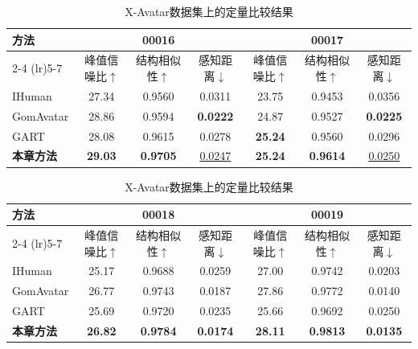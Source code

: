 \begin{table}[htbp]
    \centering\small
    \caption{X-Avatar数据集上的定量比较结果}
    \label{tab:xavatar}
    \setlength{\tabcolsep}{1pt}
    \renewcommand{\arraystretch}{1.1}

    \begin{tabular}{l ccc ccc}
        \toprule
        \multirow{2}{*}{\textbf{方法}} &
        \multicolumn{3}{c}{\textbf{00016}} &
        \multicolumn{3}{c}{\textbf{00017}} \\
        \cmidrule(lr){2-4} \cmidrule(lr){5-7}
        & 峰值信噪比$\uparrow$ & 结构相似性$\uparrow$ & 感知距离$\downarrow$
        & 峰值信噪比$\uparrow$ & 结构相似性$\uparrow$ & 感知距离$\downarrow$ \\
        \midrule
        IHuman
        & 27.34 & 0.9560 & 0.0311
        & 23.75 & 0.9453 & 0.0356 \\
        GomAvatar
        & 28.86 & 0.9594 & \textbf{0.0222}
        & 24.87 & 0.9527 & \textbf{0.0225} \\
        GART
        & 28.08 & 0.9615 & 0.0278
        & \textbf{25.24} & 0.9560 & 0.0296 \\
        \midrule
        \textbf{本章方法}
        & \textbf{29.03} & \textbf{0.9705} & \underline{0.0247}
        & \textbf{25.24} & \textbf{0.9614} & \underline{0.0250} \\
        \bottomrule
    \end{tabular}

    \vspace{0.6em}

    \begin{tabular}{l ccc ccc}
        \toprule
        \multirow{2}{*}{\textbf{方法}} &
        \multicolumn{3}{c}{\textbf{00018}} &
        \multicolumn{3}{c}{\textbf{00019}} \\
        \cmidrule(lr){2-4} \cmidrule(lr){5-7}
        & 峰值信噪比$\uparrow$ & 结构相似性$\uparrow$ & 感知距离$\downarrow$
        & 峰值信噪比$\uparrow$ & 结构相似性$\uparrow$ & 感知距离$\downarrow$ \\
        \midrule
        IHuman
        & 25.17 & 0.9688 & 0.0259
        & 27.00 & 0.9742 & 0.0203 \\
        GomAvatar
        & 26.77 & 0.9743 & 0.0187
        & 27.86 & 0.9772 & 0.0140 \\
        GART
        & 25.69 & 0.9720 & 0.0235
        & 25.66 & 0.9692 & 0.0250 \\
        \midrule
        \textbf{本章方法}
        & \textbf{26.82} & \textbf{0.9784} & \textbf{0.0174}
        & \textbf{28.11} & \textbf{0.9813} & \textbf{0.0135} \\
        \bottomrule
    \end{tabular}
\end{table}
